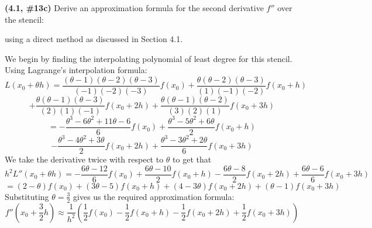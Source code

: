 \documentclass{eh-homework}
\begin{document}
\begin{question}{3}
\textbf{(4.1, \#13c)} Derive an approximation formula for the second derivative \( f'' \) over the stencil:

\begin{center}
\end{center}

using a direct method as discussed in Section 4.1.

\bigskip

We begin by finding the interpolating polynomial of least degree for this stencil. Using Lagrange's interpolation formula:
\[
    L(x_0 + \theta h) = \frac{(\theta - 1)(\theta - 2)(\theta - 3)}{(-1)(-2)(-3)}f(x_0) + \frac{\theta(\theta - 2)(\theta - 3)}{(1)(-1)(-2)}f(x_0 + h)
\]
\[
    + \frac{\theta(\theta - 1)(\theta - 3)}{(2)(1)(-1)}f(x_0 + 2h) + \frac{\theta(\theta - 1)(\theta - 2)}{(3)(2)(1)}f(x_0 + 3h)
\]
\[
    = -\frac{\theta ^3 -6 \theta ^2 + 11 \theta - 6}{6}f(x_0) + \frac{\theta ^3 -5 \theta ^2 + 6 \theta}{2}f(x_0 + h)
\]
\[
    - \frac{\theta ^3 - 4 \theta ^2 + 3 \theta}{2}f(x_0 + 2h) + \frac{\theta ^3 - 3 \theta^2 + 2 \theta}{6}f(x_0 + 3h)
\]
We take the derivative twice with respect to \(\theta\) to get that
\[
    h^2L''(x_0 + \theta h) = -\frac{6\theta - 12}{6}f(x_0)+\frac{6 \theta - 10}{2}f(x_0 + h)-\frac{6\theta - 8}{2}f(x_0 + 2h)+\frac{6\theta - 6}{6}f(x_0 + 3h)
\]
\[
    = (2- \theta)f(x_0) +(3\theta - 5)f(x_0 + h)+(4 - 3\theta)f(x_0 + 2h)+(\theta - 1)f(x_0 + 3h)
\]
Substituting \(\theta = \frac{3}{2}\) gives us the required approximation formula:
\[
    f''\left( x_0 + \frac{3}{2}h \right) \approx \frac{1}{h^2}\left( \frac{1}{2}f(x_0) - \frac{1}{2} f(x_0 + h) - \frac{1}{2} f(x_0 + 2h) + \frac{1}{2}f(x_0 + 3h) \right) 
\]
\end{question}
\end{document}
